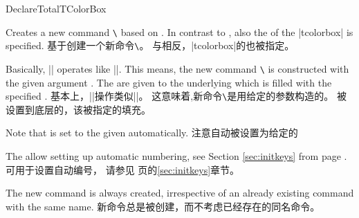 \begin{docCommand}{DeclareTotalTColorBox}{}
\begin{stripedbox}
Creates a new command \texttt{\textbackslash} based on .
In contrast to , also the  of the |tcolorbox| is specified.
\tcblower
基于创建一个新命令\texttt{\textbackslash}。%
与相反，|tcolorbox|的也被指定。
\end{stripedbox}
  
  
\begin{stripedbox}
Basically, |\DeclareTotalTColorBox| operates like |\DeclareDocumentCommand|. This means,
the new command \texttt{\textbackslash} is constructed with the given argument .
The  are given to the underlying  which is filled with
the specified .
\tcblower
基本上，|\DeclareTotalTColorBox|操作类似|\DeclareDocumentCommand|。%
这意味着,新命令\texttt{\textbackslash}是用给定的参数构造的。%
被设置到底层的，该被指定的填充。
\end{stripedbox}
  
\begin{stripedbox}
Note that  is set to the given 
automatically.
\tcblower
注意自动被设置为给定的
\end{stripedbox}

\begin{stripedbox}
The  allow setting up automatic numbering,
see Section \ref{sec:initkeys} from page \pageref{sec:initkeys}.
\tcblower
{}可用于设置自动编号，
请参见 \pageref{sec:initkeys}页的\ref{sec:initkeys}章节。
\end{stripedbox}

\begin{stripedbox}
The new command is always created, irrespective of an already existing
command with the same name.
\tcblower
新命令总是被创建，而不考虑已经存在的同名命令。
\end{stripedbox}

\end{docCommand}


